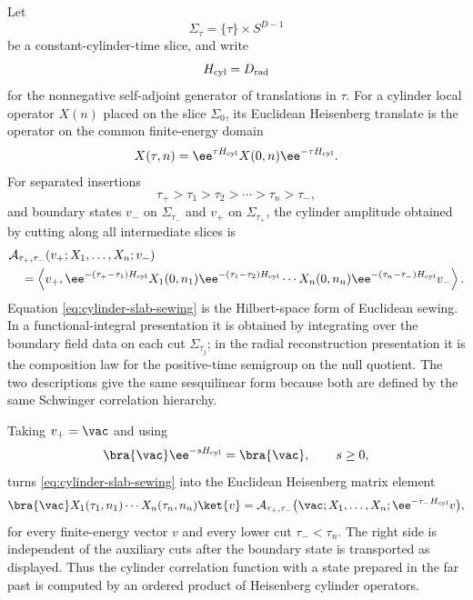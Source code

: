 \begin{construction}
\label{constr:cylinder-sewing-heisenberg}
Let
\[
  \Sigma_\tau=\{\tau\}\times S^{D-1}
\]
be a constant-cylinder-time slice, and write
\[
  H_{\rm cyl}=D_{\rm rad}
\]
for the nonnegative self-adjoint generator of translations in \(\tau\).
For a cylinder local operator \(X(n)\) placed on the slice \(\Sigma_0\), its
Euclidean Heisenberg translate is the operator on the common finite-energy
domain
\begin{equation}
  X(\tau,n)=
  \ee^{\tau H_{\rm cyl}}X(0,n)\ee^{-\tau H_{\rm cyl}} .
  \label{eq:cylinder-heisenberg-operator}
\end{equation}
For separated insertions
\[
  \tau_+>\tau_1>\tau_2>\cdots>\tau_n>\tau_- ,
\]
and boundary states \(v_-\) on \(\Sigma_{\tau_-}\) and \(v_+\) on
\(\Sigma_{\tau_+}\), the cylinder amplitude obtained by cutting along all
intermediate slices is
\begin{align}
  &\mathcal A_{\tau_+,\tau_-}
  (v_+;X_1,\ldots,X_n;v_-)
  \nonumber\\
  &\quad =
  \left\langle
    v_+,
    \ee^{-(\tau_+-\tau_1)H_{\rm cyl}}
    X_1(0,n_1)
    \ee^{-(\tau_1-\tau_2)H_{\rm cyl}}
    \cdots
    X_n(0,n_n)
    \ee^{-(\tau_n-\tau_-)H_{\rm cyl}}
    v_-
  \right\rangle .
  \label{eq:cylinder-slab-sewing}
\end{align}
Equation \eqref{eq:cylinder-slab-sewing} is the Hilbert-space form of
Euclidean sewing.  In a functional-integral presentation it is obtained by
integrating over the boundary field data on each cut \(\Sigma_{\tau_j}\); in
the radial reconstruction presentation it is the composition law for the
positive-time semigroup on the null quotient.  The two descriptions give the
same sesquilinear form because both are defined by the same Schwinger
correlation hierarchy.

Taking \(v_+=\vac\) and using
\[
  \bra{\vac}\ee^{-sH_{\rm cyl}}=\bra{\vac},
  \qquad s\ge0,
\]
turns \eqref{eq:cylinder-slab-sewing} into the Euclidean Heisenberg matrix
element
\begin{equation}
  \bra{\vac}
  X_1(\tau_1,n_1)\cdots X_n(\tau_n,n_n)
  \ket{v}
  =
  \mathcal A_{\tau_+,\tau_-}
  \bigl(\vac;X_1,\ldots,X_n;\ee^{-\tau_-H_{\rm cyl}}v\bigr),
  \label{eq:cylinder-sewing-heisenberg-matrix-element}
\end{equation}
for every finite-energy vector \(v\) and every lower cut
\(\tau_-<\tau_n\).  The right side is independent of the auxiliary cuts after
the boundary state is transported as displayed.  Thus the cylinder correlation
function with a state prepared in the far past is computed by an ordered
product of Heisenberg cylinder operators.
\end{construction}

